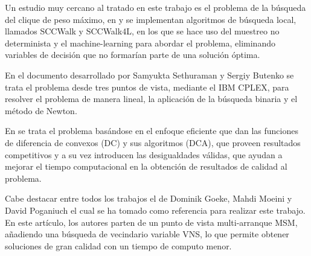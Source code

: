 Un estudio muy cercano al tratado en este trabajo es el problema de la búsqueda del clique de peso máximo, en \cite{mwcp-ls} y \cite{mwcp-ml} se implementan algoritmos de búsqueda local, llamados SCCWalk y SCCWalk4L, en los que se hace uso del muestreo no determinista y el machine-learning para abordar el problema, eliminando variables de decisión que no formarían parte de una solución óptima.

En el documento desarrollado por Samyukta Sethuraman y Sergiy Butenko \cite{mrcp-Sethuraman:2015} se trata el problema desde tres puntos de vista, mediante el IBM CPLEX, para resolver el problema de manera lineal, la aplicación de la búsqueda binaria y el método de Newton.

En \cite{mrcp-moeni} se trata el problema basándose en el enfoque eficiente que dan las funciones de diferencia de convexos (DC) y sus algoritmos (DCA), que proveen resultados competitivos y a su vez introducen las desigualdades válidas, que ayudan a mejorar el tiempo computacional en la obtención de resultados de calidad al problema.

Cabe destacar entre todos los trabajos el de Dominik Goeke, Mahdi Moeini y David Poganiuch \cite{mrcp-GOEKE2017283} el cual se ha tomado como referencia para realizar este trabajo. En este artículo, los autores parten de un punto de vista multi-arranque \gls{MSM}, añadiendo una búsqueda de vecindario variable \gls{VNS}, lo que permite obtener soluciones de gran calidad con un tiempo de computo menor.


